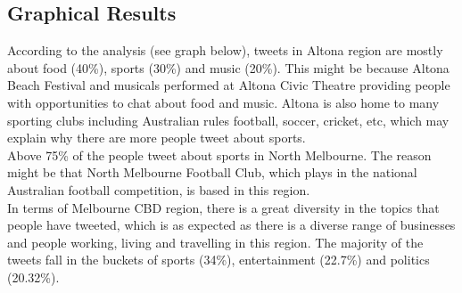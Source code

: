 \documentclass[parskip=full, 11pt]{article}
\begin{document}
\subsection{Graphical Results}
According to the analysis (see graph below), tweets in Altona region are mostly about food (40\%), sports (30\%) and music (20\%). This might be because Altona Beach Festival and musicals performed at Altona Civic Theatre providing people with opportunities to chat about food and music. Altona is also home to many sporting clubs including Australian rules football, soccer, cricket, etc, which may explain why there are more people tweet about sports.\\
Above 75\% of the people tweet about sports in North Melbourne. The reason might be that North Melbourne Football Club, which plays in the national Australian football competition, is based in this region.\\
In terms of Melbourne CBD region, there is a great diversity in the topics that people have tweeted, which is as expected as there is a diverse range of businesses and people working, living and travelling in this region. The majority of the tweets fall in the buckets of sports (34\%), entertainment (22.7\%) and politics (20.32\%).
\end{document}
